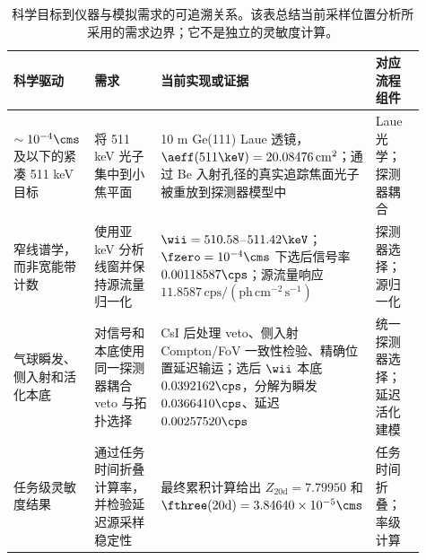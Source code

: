 \begin{table}[t]
\centering
\caption{科学目标到仪器与模拟需求的可追溯关系。该表总结当前采样位置分析所采用的需求边界；它不是独立的灵敏度计算。}
\label{tab:requirements_traceability}
\footnotesize
\begin{tabular}{@{}p{0.20\linewidth}p{0.22\linewidth}p{0.35\linewidth}p{0.14\linewidth}@{}}
\toprule
科学驱动 & 需求 & 当前实现或证据 & 对应流程组件 \\
\midrule
$\sim10^{-4}\cms$ 及以下的紧凑 511 keV 目标 & 将 511 keV 光子集中到小焦平面 & 10 m Ge(111) Laue 透镜，$\aeff(511\keV)=20.08476\,\mathrm{cm^2}$；通过 Be 入射孔径的真实追踪焦面光子被重放到探测器模型中 & Laue 光学；探测器耦合 \\
窄线谱学，而非宽能带计数 & 使用亚 keV 分析线窗并保持源流量归一化 & $\wii=510.58$--$511.42\keV$；$\fzero=10^{-4}\cms$ 下选后信号率 $0.00118587\cps$；源流量响应 $11.8587\,\mathrm{cps}/(\mathrm{ph\,cm^{-2}\,s^{-1}})$ & 探测器选择；源归一化 \\
气球瞬发、侧入射和活化本底 & 对信号和本底使用同一探测器耦合 veto 与拓扑选择 & CsI 后处理 veto、侧入射 Compton/FoV 一致性检验、精确位置延迟输运；选后 $\wii$ 本底 $0.0392162\cps$，分解为瞬发 $0.0366410\cps$、延迟 $0.00257520\cps$ & 统一探测器选择；延迟活化建模 \\
任务级灵敏度结果 & 通过任务时间折叠计算率，并检验延迟源采样稳定性 & 最终累积计算给出 $Z_{20\mathrm{d}}=7.79950$ 和 $\fthree(20\mathrm{d})=3.84640\times10^{-5}\cms$ & 任务时间折叠；率级计算 \\
\bottomrule
\end{tabular}
\end{table}
